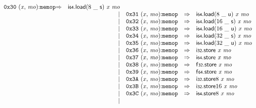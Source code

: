 $$\begin{array}{@{}l@{}rrlll@{}l@{}}
\mathtt{0x30}~({\mathit{x}},\, {\mathit{mo}}){:}{\mathtt{memop}} &\Rightarrow& {\mathsf{i{\scriptstyle64}}.\mathsf{load}}{(8~\mathsf{\_}~\mathsf{s})}~{\mathit{x}}~{\mathit{mo}} \\ &&|&
\mathtt{0x31}~({\mathit{x}},\, {\mathit{mo}}){:}{\mathtt{memop}} &\Rightarrow& {\mathsf{i{\scriptstyle64}}.\mathsf{load}}{(8~\mathsf{\_}~\mathsf{u})}~{\mathit{x}}~{\mathit{mo}} \\ &&|&
\mathtt{0x32}~({\mathit{x}},\, {\mathit{mo}}){:}{\mathtt{memop}} &\Rightarrow& {\mathsf{i{\scriptstyle64}}.\mathsf{load}}{(16~\mathsf{\_}~\mathsf{s})}~{\mathit{x}}~{\mathit{mo}} \\ &&|&
\mathtt{0x33}~({\mathit{x}},\, {\mathit{mo}}){:}{\mathtt{memop}} &\Rightarrow& {\mathsf{i{\scriptstyle64}}.\mathsf{load}}{(16~\mathsf{\_}~\mathsf{u})}~{\mathit{x}}~{\mathit{mo}} \\ &&|&
\mathtt{0x34}~({\mathit{x}},\, {\mathit{mo}}){:}{\mathtt{memop}} &\Rightarrow& {\mathsf{i{\scriptstyle64}}.\mathsf{load}}{(32~\mathsf{\_}~\mathsf{s})}~{\mathit{x}}~{\mathit{mo}} \\ &&|&
\mathtt{0x35}~({\mathit{x}},\, {\mathit{mo}}){:}{\mathtt{memop}} &\Rightarrow& {\mathsf{i{\scriptstyle64}}.\mathsf{load}}{(32~\mathsf{\_}~\mathsf{u})}~{\mathit{x}}~{\mathit{mo}} \\ &&|&
\mathtt{0x36}~({\mathit{x}},\, {\mathit{mo}}){:}{\mathtt{memop}} &\Rightarrow& \mathsf{i{\scriptstyle32}}.\mathsf{store}~{\mathit{x}}~{\mathit{mo}} \\ &&|&
\mathtt{0x37}~({\mathit{x}},\, {\mathit{mo}}){:}{\mathtt{memop}} &\Rightarrow& \mathsf{i{\scriptstyle64}}.\mathsf{store}~{\mathit{x}}~{\mathit{mo}} \\ &&|&
\mathtt{0x38}~({\mathit{x}},\, {\mathit{mo}}){:}{\mathtt{memop}} &\Rightarrow& \mathsf{f{\scriptstyle32}}.\mathsf{store}~{\mathit{x}}~{\mathit{mo}} \\ &&|&
\mathtt{0x39}~({\mathit{x}},\, {\mathit{mo}}){:}{\mathtt{memop}} &\Rightarrow& \mathsf{f{\scriptstyle64}}.\mathsf{store}~{\mathit{x}}~{\mathit{mo}} \\ &&|&
\mathtt{0x3A}~({\mathit{x}},\, {\mathit{mo}}){:}{\mathtt{memop}} &\Rightarrow& {\mathsf{i{\scriptstyle32}}.\mathsf{store}}{8}~{\mathit{x}}~{\mathit{mo}} \\ &&|&
\mathtt{0x3B}~({\mathit{x}},\, {\mathit{mo}}){:}{\mathtt{memop}} &\Rightarrow& {\mathsf{i{\scriptstyle32}}.\mathsf{store}}{16}~{\mathit{x}}~{\mathit{mo}} \\ &&|&
\mathtt{0x3C}~({\mathit{x}},\, {\mathit{mo}}){:}{\mathtt{memop}} &\Rightarrow& {\mathsf{i{\scriptstyle64}}.\mathsf{store}}{8}~{\mathit{x}}~{\mathit{mo}} \\ &&|&

\end{array}$$
